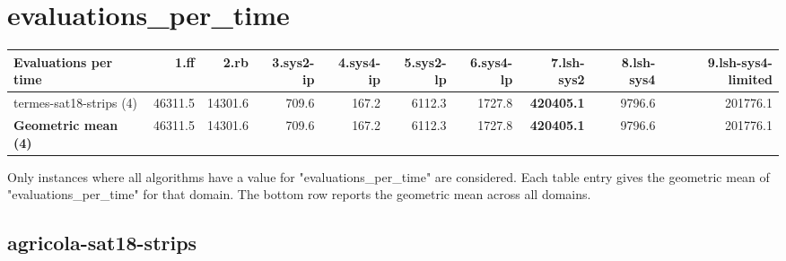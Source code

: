 \documentclass{article}
\newcommand{\numtasks}[1]{\small{(#1)}}
\begin{document}
\hypertarget{evaluations_per_time}{}
\section*{evaluations\_per\_time}

\begin{tabular}{@{}lrrrrrrrrr@{}}
Evaluations per time & 1.ff & 2.rb & 3.sys2-ip & 4.sys4-ip & 5.sys2-lp & 6.sys4-lp & 7.lsh-sys2 & 8.lsh-sys4 & 9.lsh-sys4-limited \\
\midrule
termes-sat18-strips \numtasks{4} & 46311.5 & 14301.6 & 709.6 & 167.2 & 6112.3 & 1727.8 & \textbf{420405.1} & 9796.6 & 201776.1 \\
\textbf{Geometric mean \numtasks{4}} & 46311.5 & 14301.6 & 709.6 & 167.2 & 6112.3 & 1727.8 & \textbf{420405.1} & 9796.6 & 201776.1 \\
\end{tabular}

Only instances where all algorithms have a value for "evaluations\_per\_time" are considered. Each table entry gives the geometric mean of "evaluations\_per\_time" for that domain. The bottom row reports the geometric mean across all domains.

\hypertarget{evaluations_per_time-agricola-sat18-strips}{}
\subsection*{agricola-sat18-strips}
\end{document}
